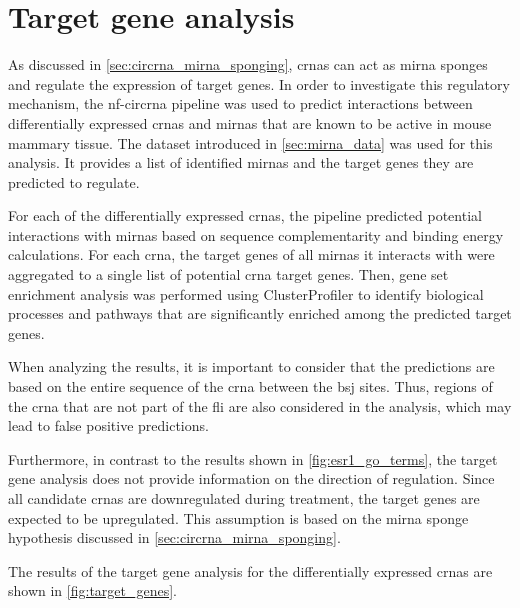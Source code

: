 \section{Target gene analysis}

As discussed in \cref{sec:circrna_mirna_sponging}, \glspl{crna} can act as
\gls{mirna} sponges and regulate the expression of target genes.
In order to investigate this regulatory mechanism, the \gls{nf-circrna}
pipeline was used to predict interactions between differentially expressed
\glspl{crna} and \glspl{mirna} that are known to be active in mouse mammary
tissue.
The dataset introduced in \cref{sec:mirna_data} was used for this analysis.
It provides a list of identified \glspl{mirna} and the target genes they are
predicted to regulate.

For each of the differentially expressed \glspl{crna}, the pipeline predicted
potential interactions with \glspl{mirna} based on sequence complementarity and
binding energy calculations.
For each \gls{crna}, the target genes of all \glspl{mirna} it interacts with
were aggregated to a single list of potential \gls{crna} target genes.
Then, gene set enrichment analysis was performed using ClusterProfiler to
identify biological processes and pathways that are significantly enriched
among the predicted target genes.

When analyzing the results, it is important to consider that the predictions
are based on the entire sequence of the \gls{crna} between the \gls{bsj} sites.
Thus, regions of the \gls{crna} that are not part of the \gls{fli} are also
considered in the analysis, which may lead to false positive predictions.

Furthermore, in contrast to the results shown in \cref{fig:esr1_go_terms}, the
target gene analysis does not provide information on the direction of
regulation. Since all candidate \glspl{crna} are downregulated during treatment,
the target genes are expected to be upregulated. This assumption is based on the
\gls{mirna} sponge hypothesis discussed in \cref{sec:circrna_mirna_sponging}.

The results of the target gene analysis for the differentially expressed
\glspl{crna} are shown in \cref{fig:target_genes}.


